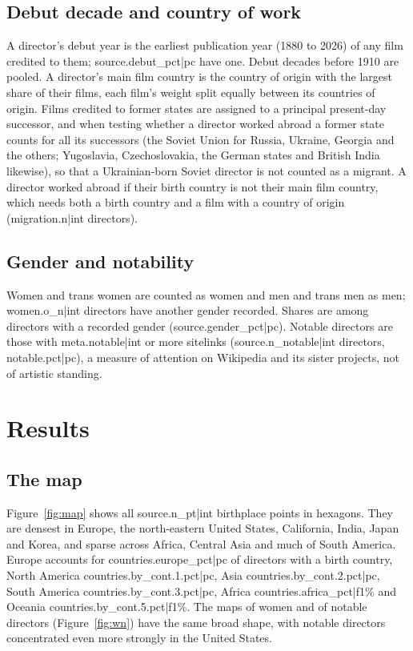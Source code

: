 \documentclass[11pt,a4paper]{article}
\begin{document}
\subsection{Debut decade and country of work}
A director's debut year is the earliest publication year (1880 to 2026) of any film credited to them; {{source.debut_pct|pc}} have one. Debut decades before 1910 are pooled. A director's main film country is the country of origin with the largest share of their films, each film's weight split equally between its countries of origin. Films credited to former states are assigned to a principal present-day successor, and when testing whether a director worked abroad a former state counts for all its successors (the Soviet Union for Russia, Ukraine, Georgia and the others; Yugoslavia, Czechoslovakia, the German states and British India likewise), so that a Ukrainian-born Soviet director is not counted as a migrant. A director worked abroad if their birth country is not their main film country, which needs both a birth country and a film with a country of origin ({{migration.n|int}} directors).

\subsection{Gender and notability}
Women and trans women are counted as women and men and trans men as men; {{women.o_n|int}} directors have another gender recorded. Shares are among directors with a recorded gender ({{source.gender_pct|pc}}). Notable directors are those with {{meta.notable|int}} or more sitelinks ({{source.n_notable|int}} directors, {{notable.pct|pc}}), a measure of attention on Wikipedia and its sister projects, not of artistic standing.

\section{Results}
\subsection{The map}
Figure~\ref{fig:map} shows all {{source.n_pt|int}} birthplace points in hexagons. They are densest in Europe, the north-eastern United States, California, India, Japan and Korea, and sparse across Africa, Central Asia and much of South America. Europe accounts for {{countries.europe_pct|pc}} of directors with a birth country, North America {{countries.by_cont.1.pct|pc}}, Asia {{countries.by_cont.2.pct|pc}}, South America {{countries.by_cont.3.pct|pc}}, Africa {{countries.africa_pct|f1}}\% and Oceania {{countries.by_cont.5.pct|f1}}\%. The maps of women and of notable directors (Figure~\ref{fig:wn}) have the same broad shape, with notable directors concentrated even more strongly in the United States.
\end{document}
